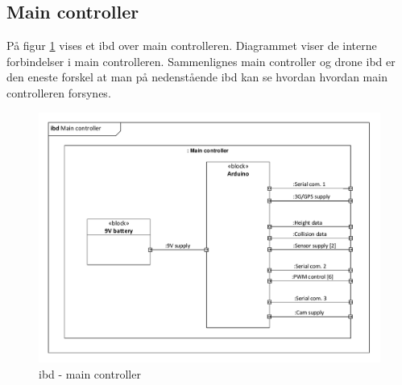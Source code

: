 \subsection{Main controller}

På figur \ref{fig:ibd_maincontroller} vises et ibd over main controlleren. Diagrammet viser de interne forbindelser i main controlleren. Sammenlignes main controller og drone ibd er den eneste forskel at man på nedenstående ibd kan se hvordan hvordan main controlleren forsynes.  

\begin{figure}[H]
\centering
\includegraphics[width=1\textwidth]{Billeder/IBD/ibd3_maincontroller.pdf}
\vspace{-1cm}
\caption{ibd - main controller}
\label{fig:ibd_maincontroller}
\end{figure}


